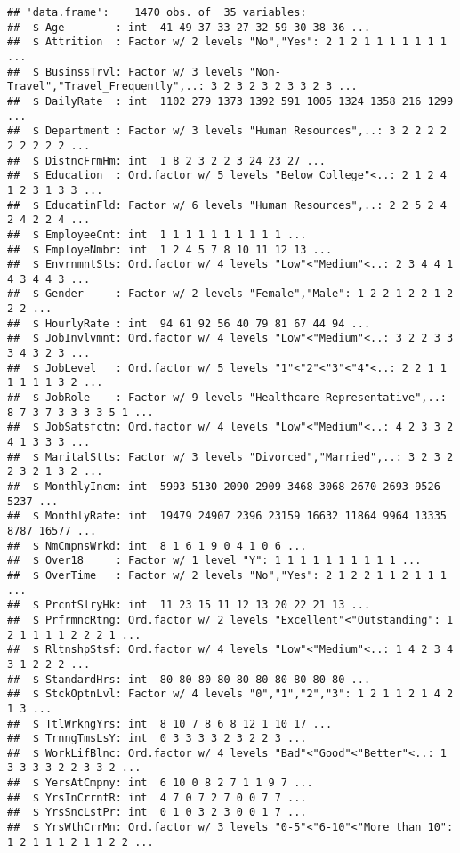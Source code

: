 \documentclass[]{article}
\begin{document}
\begin{verbatim}
## 'data.frame':    1470 obs. of  35 variables:
##  $ Age        : int  41 49 37 33 27 32 59 30 38 36 ...
##  $ Attrition  : Factor w/ 2 levels "No","Yes": 2 1 2 1 1 1 1 1 1 1 ...
##  $ BusinssTrvl: Factor w/ 3 levels "Non-Travel","Travel_Frequently",..: 3 2 3 2 3 2 3 3 2 3 ...
##  $ DailyRate  : int  1102 279 1373 1392 591 1005 1324 1358 216 1299 ...
##  $ Department : Factor w/ 3 levels "Human Resources",..: 3 2 2 2 2 2 2 2 2 2 ...
##  $ DistncFrmHm: int  1 8 2 3 2 2 3 24 23 27 ...
##  $ Education  : Ord.factor w/ 5 levels "Below College"<..: 2 1 2 4 1 2 3 1 3 3 ...
##  $ EducatinFld: Factor w/ 6 levels "Human Resources",..: 2 2 5 2 4 2 4 2 2 4 ...
##  $ EmployeeCnt: int  1 1 1 1 1 1 1 1 1 1 ...
##  $ EmployeNmbr: int  1 2 4 5 7 8 10 11 12 13 ...
##  $ EnvrnmntSts: Ord.factor w/ 4 levels "Low"<"Medium"<..: 2 3 4 4 1 4 3 4 4 3 ...
##  $ Gender     : Factor w/ 2 levels "Female","Male": 1 2 2 1 2 2 1 2 2 2 ...
##  $ HourlyRate : int  94 61 92 56 40 79 81 67 44 94 ...
##  $ JobInvlvmnt: Ord.factor w/ 4 levels "Low"<"Medium"<..: 3 2 2 3 3 3 4 3 2 3 ...
##  $ JobLevel   : Ord.factor w/ 5 levels "1"<"2"<"3"<"4"<..: 2 2 1 1 1 1 1 1 3 2 ...
##  $ JobRole    : Factor w/ 9 levels "Healthcare Representative",..: 8 7 3 7 3 3 3 3 5 1 ...
##  $ JobSatsfctn: Ord.factor w/ 4 levels "Low"<"Medium"<..: 4 2 3 3 2 4 1 3 3 3 ...
##  $ MaritalStts: Factor w/ 3 levels "Divorced","Married",..: 3 2 3 2 2 3 2 1 3 2 ...
##  $ MonthlyIncm: int  5993 5130 2090 2909 3468 3068 2670 2693 9526 5237 ...
##  $ MonthlyRate: int  19479 24907 2396 23159 16632 11864 9964 13335 8787 16577 ...
##  $ NmCmpnsWrkd: int  8 1 6 1 9 0 4 1 0 6 ...
##  $ Over18     : Factor w/ 1 level "Y": 1 1 1 1 1 1 1 1 1 1 ...
##  $ OverTime   : Factor w/ 2 levels "No","Yes": 2 1 2 2 1 1 2 1 1 1 ...
##  $ PrcntSlryHk: int  11 23 15 11 12 13 20 22 21 13 ...
##  $ PrfrmncRtng: Ord.factor w/ 2 levels "Excellent"<"Outstanding": 1 2 1 1 1 1 2 2 2 1 ...
##  $ RltnshpStsf: Ord.factor w/ 4 levels "Low"<"Medium"<..: 1 4 2 3 4 3 1 2 2 2 ...
##  $ StandardHrs: int  80 80 80 80 80 80 80 80 80 80 ...
##  $ StckOptnLvl: Factor w/ 4 levels "0","1","2","3": 1 2 1 1 2 1 4 2 1 3 ...
##  $ TtlWrkngYrs: int  8 10 7 8 6 8 12 1 10 17 ...
##  $ TrnngTmsLsY: int  0 3 3 3 3 2 3 2 2 3 ...
##  $ WorkLifBlnc: Ord.factor w/ 4 levels "Bad"<"Good"<"Better"<..: 1 3 3 3 3 2 2 3 3 2 ...
##  $ YersAtCmpny: int  6 10 0 8 2 7 1 1 9 7 ...
##  $ YrsInCrrntR: int  4 7 0 7 2 7 0 0 7 7 ...
##  $ YrsSncLstPr: int  0 1 0 3 2 3 0 0 1 7 ...
##  $ YrsWthCrrMn: Ord.factor w/ 3 levels "0-5"<"6-10"<"More than 10": 1 2 1 1 1 2 1 1 2 2 ...
\end{verbatim}
\end{document}
